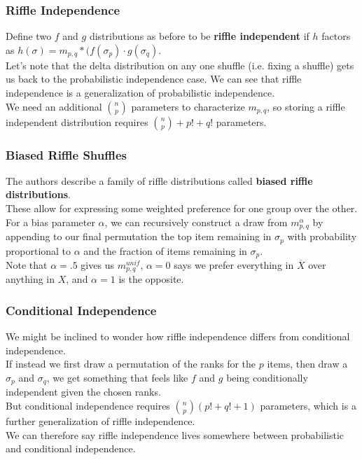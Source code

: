 \documentclass{beamer} %
\theoremstyle{definition} %
\def \pausenl {\pause $ \ $\\}
\begin{document}
\begin{frame}
	\frametitle{Riffle Independence}
	
	Define two $f$ and $g$ distributions as before to be \textbf{riffle independent} if $h$ factors as $h(\sigma) = m_{p,q} \ast (f(\sigma_p)\cdot g(\sigma_q)$.\\
	
	\pausenl
	
	Let's note that the delta distribution on any one shuffle (i.e. fixing a shuffle) gets us back to the probabilistic independence case.  We can see that riffle independence is a generalization of probabilistic independence.\\
	
	\pausenl
	
	We need an additional $\binom{n}{p}$ parameters to characterize $m_{p,q}$, so storing a riffle independent distribution requires $\binom{n}{p} + p! + q!$ parameters.
	
	
\end{frame}


\begin{frame}
	\frametitle{Biased Riffle Shuffles}
	
	The authors describe a family of riffle distributions called \textbf{biased riffle distributions}.\\
	\pause
	These allow for expressing some weighted preference for one group over the other.\\
	
	\pausenl
	
	For a bias parameter $\alpha$, we can recursively construct a draw from $m_{p,q}^\alpha$ by appending to our final permutation the top item remaining in $\sigma_p$ with probability proportional to $\alpha$ and the fraction of items remaining in $\sigma_p$.\\
	\pausenl
	
	Note that $\alpha=.5$ gives us $m_{p,q}^{unif}$, $\alpha=0$ says we prefer everything in $\overline{X}$ over anything in $X$, and $\alpha=1$ is the opposite.
\end{frame}
\begin{frame}
	
\frametitle{Conditional Independence}

We might be inclined to wonder how riffle independence differs from conditional independence.\\

\pausenl

If instead we first draw a permutation of the ranks for the $p$ items, then draw a $\sigma_p$ and $\sigma_q$, we get something that feels like $f$ and $g$ being conditionally independent given the chosen ranks.\\

\pausenl

But conditional independence requires $\binom{n}{p} (p!+q! + 1)$ parameters, which is a further generalization of riffle independence. \\\pausenl
 We can therefore say riffle independence lives somewhere between probabilistic and conditional independence.
\end{frame}
\end{document}
